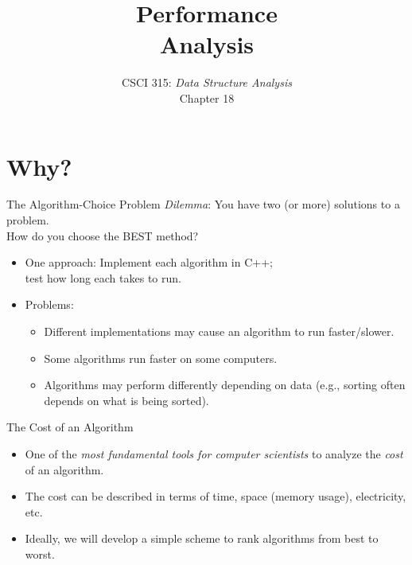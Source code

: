 \documentclass[14pt,aspectratio=1610, hyperref={pdfpagelayout=SinglePage}]{beamer}
\title{\Huge{}Performance\\ Analysis}
\subtitle{CSCI 315: \textit{Data Structure Analysis}\\Chapter 18}
\institute{Charleston Southern University}
\begin{document}
\begin{frame}
  \titlepage{}
\end{frame}

\section{Why?}

\begin{frame}{The Algorithm-Choice Problem}
  \emph{Dilemma}: You have two (or more) solutions to a\\ problem.\\
  How do you choose the BEST method?
\begin{itemize}
\item<2->
  One approach: Implement each algorithm in C++;\\ test how long each takes to run.
\item<3->
  Problems:
  \begin{itemize}
  \item<3->
    Different implementations may cause an algorithm to run faster/slower.
  \item<4->
    Some algorithms run faster on some computers.
  \item<5->
    Algorithms may perform differently depending on data (e.g., sorting often
    depends on what is being sorted).
  \end{itemize}
\end{itemize}
\end{frame}

\begin{frame}{The Cost of an Algorithm}
\begin{itemize}[<+->]
\item
  One of the \textit{most fundamental tools for computer scientists} to analyze the \emph{cost} of an
algorithm.\\[1em]
\item
  The cost can be described in terms of time, space (memory usage), electricity, etc.\\[1em]
\item
  Ideally, we will develop a simple scheme to rank algorithms from best to worst.
\end{itemize}
\end{frame}
\end{document}
